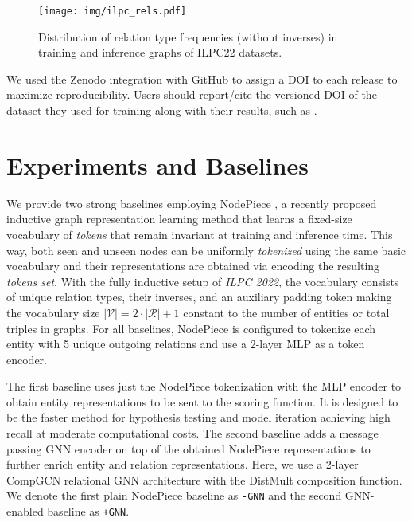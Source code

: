 \documentclass[sigconf,screen]{acmart}
\newcommand{\ilpc}{\textsl{\textsc{ILPC 2022}}\xspace}
\begin{document}
\begin{figure}[!h]
    \centering
    \texttt{[image: img/ilpc\_rels.pdf]}
    \caption{Distribution of relation type frequencies (without inverses) in training and inference graphs of ILPC22 datasets.}
    \label{fig:inductive_lp2}
\end{figure}

We used the Zenodo integration with GitHub to assign a DOI to each release to maximize reproducibility. Users should report/cite the versioned DOI of the dataset they used for training along with their results, such as \cite{ilpc2022github}.

\section{Experiments and Baselines}
\label{sec:experiments}

We provide two strong baselines employing NodePiece \cite{galkin2022nodepiece}, a recently proposed inductive graph representation learning method that learns a fixed-size vocabulary of \emph{tokens} that remain invariant at training and inference time. 
This way, both seen and unseen nodes can be uniformly \emph{tokenized} using the same basic vocabulary and their representations are obtained via encoding the resulting \emph{tokens set}. 
With the fully inductive setup of \ilpc, the vocabulary consists of unique relation types, their inverses, and an auxiliary padding token making the vocabulary size $|\mathcal{V}| = 2 \cdot |\mathcal{R}| + 1$ constant to the number of entities or total triples in graphs. 
For all baselines, NodePiece is configured to tokenize each entity with 5 unique outgoing relations and use a 2-layer MLP as a token encoder.

The first baseline uses just the NodePiece tokenization with the MLP encoder to obtain entity representations to be sent to the scoring function. 
It is designed to be the faster method for hypothesis testing and model iteration achieving high recall at moderate computational costs.
The second baseline adds a message passing GNN encoder on top of the obtained NodePiece representations to further enrich entity and relation representations.
Here, we use a 2-layer CompGCN \cite{DBLP:conf/iclr/VashishthSNT20} relational GNN architecture with the DistMult \cite{DBLP:journals/corr/YangYHGD14a} composition function.
We denote the first plain NodePiece baseline as \texttt{-GNN} and the second GNN-enabled baseline as \texttt{+GNN}.
\end{document}
